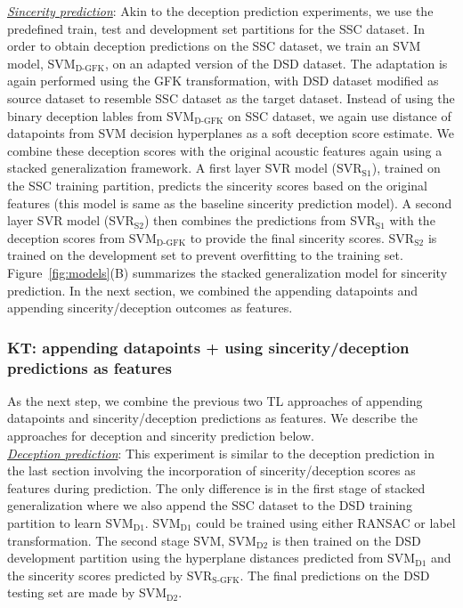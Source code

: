\documentclass{article}
\begin{document}
\noindent\underline{\it Sincerity prediction}:
Akin to the deception prediction experiments, we use the predefined train, test and development set partitions for the SSC dataset.
In order to obtain deception predictions on the SSC dataset, we train an SVM model, SVM$_\text{D-GFK}$, on an adapted version of the DSD dataset.
The adaptation is again performed using the GFK transformation, with DSD dataset modified as source dataset to resemble SSC dataset as the target dataset.
Instead of using the binary deception lables from SVM$_\text{D-GFK}$ on SSC dataset, we again use distance of datapoints from SVM decision hyperplanes as a soft deception score estimate. 
We combine these deception scores with the original acoustic features again using a stacked generalization framework. 
A first layer SVR model (SVR$_\text{S1}$), trained on the SSC training partition, predicts the sincerity scores based on the original features (this model is same as the baseline sincerity prediction model). 
A second layer SVR model (SVR$_\text{S2}$) then combines the predictions from SVR$_\text{S1}$ with the deception scores from SVM$_\text{D-GFK}$ to provide the final sincerity scores.  
SVR$_\text{S2}$ is trained on the development set to prevent overfitting to the training set.
Figure~\ref{fig:models}(B) summarizes the stacked generalization model for sincerity prediction. 
In the next section, we combined the appending datapoints and appending sincerity/deception outcomes as features. 

\subsubsection{KT: appending datapoints + using sincerity/deception predictions as features}
As the next step, we combine the previous two TL approaches of appending datapoints and sincerity/deception predictions as features.
We describe the approaches for deception and sincerity prediction below.
\\

\noindent\underline{\it Deception prediction}: 
This experiment is similar to the deception prediction in the last section involving the incorporation of sincerity/deception scores as features during prediction.
The only difference is in the first stage of stacked generalization where we also append the SSC dataset to the DSD training partition to learn SVM$_\text{D1}$. 
SVM$_\text{D1}$ could be trained using either RANSAC or label transformation.
The second stage SVM, SVM$_\text{D2}$ is then trained on the DSD development partition using the hyperplane distances predicted from SVM$_\text{D1}$ and the sincerity scores predicted by SVR$_\text{S-GFK}$. 
The final predictions on the DSD testing set are made by SVM$_\text{D2}$.
\\
\end{document}
